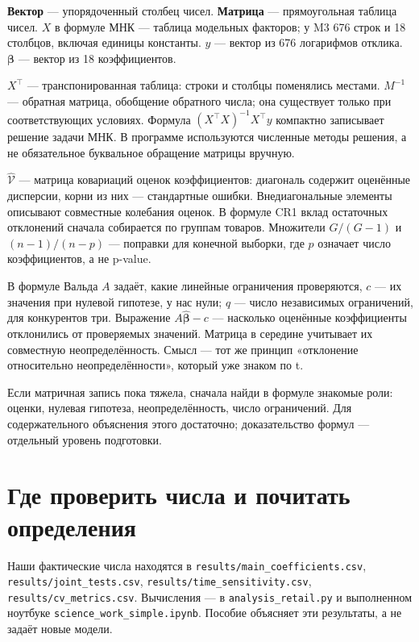 \documentclass[12pt,a4paper]{article}
\begin{document}
\textbf{Вектор} --- упорядоченный столбец чисел. \textbf{Матрица} --- прямоугольная таблица чисел. $X$ в формуле МНК --- таблица модельных факторов; у M3 676 строк и 18 столбцов, включая единицы константы. $y$ --- вектор из 676 логарифмов отклика. $\boldsymbol\beta$ --- вектор из 18 коэффициентов.

$X^\top$ --- транспонированная таблица: строки и столбцы поменялись местами. $M^{-1}$ --- обратная матрица, обобщение обратного числа; она существует только при соответствующих условиях. Формула $(X^\top X)^{-1}X^\top y$ компактно записывает решение задачи МНК. В программе используются численные методы решения, а не обязательное буквальное обращение матрицы вручную.

$\widehat{\mathcal V}$ --- матрица ковариаций оценок коэффициентов: диагональ содержит оценённые дисперсии, корни из них --- стандартные ошибки. Внедиагональные элементы описывают совместные колебания оценок. В формуле CR1 вклад остаточных отклонений сначала собирается по группам товаров. Множители $G/(G-1)$ и $(n-1)/(n-p)$ --- поправки для конечной выборки, где $p$ означает число коэффициентов, а не p-value.

В формуле Вальда $A$ задаёт, какие линейные ограничения проверяются, $c$ --- их значения при нулевой гипотезе, у нас нули; $q$ --- число независимых ограничений, для конкурентов три. Выражение $A\widehat{\boldsymbol\beta}-c$ --- насколько оценённые коэффициенты отклонились от проверяемых значений. Матрица в середине учитывает их совместную неопределённость. Смысл --- тот же принцип «отклонение относительно неопределённости», который уже знаком по t.

Если матричная запись пока тяжела, сначала найди в формуле знакомые роли: оценки, нулевая гипотеза, неопределённость, число ограничений. Для содержательного объяснения этого достаточно; доказательство формул --- отдельный уровень подготовки.

\section{Где проверить числа и почитать определения}

Наши фактические числа находятся в \texttt{results/main\_coefficients.csv}, \texttt{results/joint\_tests.csv}, \texttt{results/time\_sensitivity.csv}, \texttt{results/cv\_metrics.csv}. Вычисления --- в \texttt{analysis\_retail.py} и выполненном ноутбуке \texttt{science\_work\_simple.ipynb}. Пособие объясняет эти результаты, а не задаёт новые модели.
\end{document}
